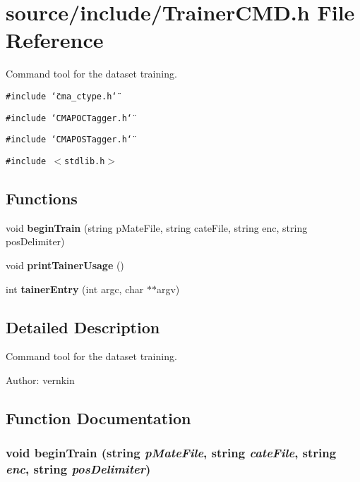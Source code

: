 \section{source/include/TrainerCMD.h File Reference}
\label{TrainerCMD_8h}
Command tool for the dataset training.  


{\tt \#include \char`\"{}cma\_\-ctype.h\char`\"{}}\par
{\tt \#include \char`\"{}CMAPOCTagger.h\char`\"{}}\par
{\tt \#include \char`\"{}CMAPOSTagger.h\char`\"{}}\par
{\tt \#include $<$stdlib.h$>$}\par
\subsection*{Functions}
\begin{CompactItemize}
\item 
void {\bf beginTrain} (string pMateFile, string cateFile, string enc, string posDelimiter)
\item 
void {\bf printTainerUsage} ()
\item 
int {\bf tainerEntry} (int argc, char $\ast$$\ast$argv)
\end{CompactItemize}


\subsection{Detailed Description}
Command tool for the dataset training. 

\begin{Desc}
\item[Author:]vernkin \end{Desc}


\subsection{Function Documentation}
\subsubsection[{beginTrain}]{\setlength{\rightskip}{0pt plus 5cm}void beginTrain (string {\em pMateFile}, \/  string {\em cateFile}, \/  string {\em enc}, \/  string {\em posDelimiter})}\label{TrainerCMD_8h_412f108b13959fdc8d7a91eabb2ba536}


